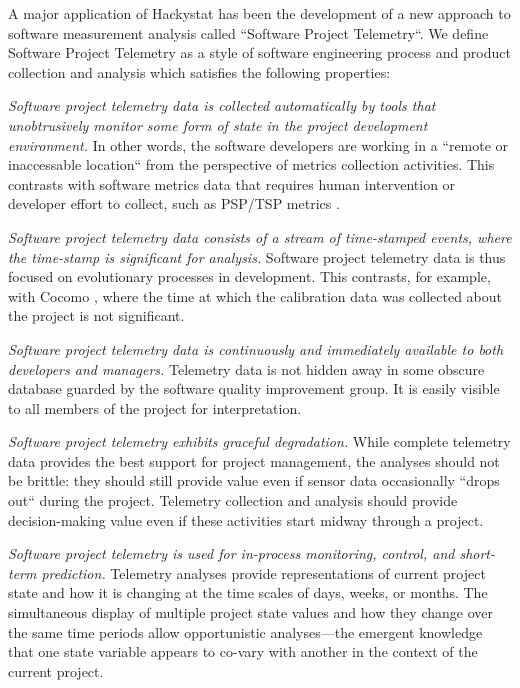 \documentclass[times,10pt,twocolumn]{article}
\begin{document}
A major application of Hackystat has been the development of a new
approach to software measurement analysis called ``Software Project
Telemetry``. We define Software Project Telemetry as a style of
software engineering process and product collection and analysis which
satisfies the following properties:

{\em Software project telemetry data is collected automatically by tools
that unobtrusively monitor some form of state in the project development
environment.}  In other words, the software developers are working in a
``remote or inaccessable location`` from the perspective of metrics
collection activities. This contrasts with software metrics data that
requires human intervention or developer effort to collect, such as PSP/TSP
metrics \cite{Humphrey95}.
        
{\em Software project telemetry data consists of a stream of time-stamped
events, where the time-stamp is significant for analysis.}  Software
project telemetry data is thus focused on evolutionary processes in
development.  This contrasts, for example, with Cocomo \cite{Boehm81},
where the time at which the calibration data was collected about the
project is not significant.

{\em Software project telemetry data is continuously and immediately
available to both developers and managers.}  Telemetry data is not hidden
away in some obscure database guarded by the software quality improvement
group.  It is easily visible to all members of the project for
interpretation.

{\em Software project telemetry exhibits graceful degradation.}  While
complete telemetry data provides the best support for project management,
the analyses should not be brittle: they should still provide value even if
sensor data occasionally ``drops out`` during the project. Telemetry
collection and analysis should provide decision-making value even if these
activities start midway through a project.
         
{\em Software project telemetry is used for in-process monitoring, control,
and short-term prediction.} Telemetry analyses provide representations of
current project state and how it is changing at the time scales of days,
weeks, or months.  The simultaneous display of multiple project state
values and how they change over the same time periods allow opportunistic
analyses---the emergent knowledge that one state variable appears to
co-vary with another in the context of the current project.
\end{document}
